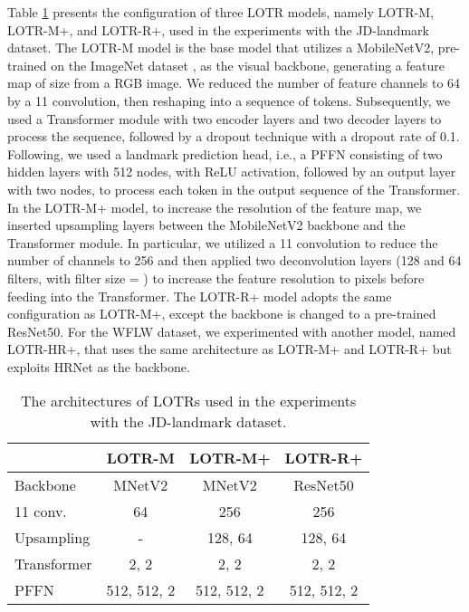 \documentclass[journal]{IEEEtran}
\begin{document}
Table \ref{tab:lotr_models} presents the configuration of three LOTR models, namely LOTR-M, LOTR-M+, and LOTR-R+, used in the experiments with the JD-landmark dataset. 
The LOTR-M model is the base model that utilizes a MobileNetV2, pre-trained on the ImageNet dataset \cite{imagenet09}, as the visual backbone, generating a feature map of size  from a  RGB image. 
We reduced the number of feature channels to 64 by a 11 convolution, then reshaping into a sequence of tokens.
Subsequently, we used a Transformer module with two encoder layers and two decoder layers to process the sequence, followed by a dropout technique \cite{srivastava14a} with a dropout rate of 0.1.
Following, we used a landmark prediction head, i.e., a PFFN consisting of two hidden layers with 512 nodes, with ReLU activation, followed by an output layer with two nodes, to process each token in the output sequence of the Transformer.
In the LOTR-M+ model, to increase the resolution of the feature map, we inserted upsampling layers between the MobileNetV2 backbone and the Transformer module.
In particular, we utilized a 11 convolution to reduce the number of channels to 256 and then applied two deconvolution layers (128 and 64 filters, with filter size  = ) to increase the feature resolution to  pixels before feeding into the Transformer.
The LOTR-R+ model adopts the same configuration as LOTR-M+, except the backbone is changed to a pre-trained ResNet50.
For the WFLW dataset, we experimented with another model, named LOTR-HR+, that uses the same architecture as LOTR-M+ and LOTR-R+ but exploits HRNet \cite{Wang2021HRNet} as the backbone.

\begin{table}
\caption{The architectures of LOTRs used in the experiments with the JD-landmark dataset.}
\centering
\begin{tabular}{lccc}
\hline
                 & LOTR-M & LOTR-M+ & LOTR-R+ \\
\hline
Backbone         & MNetV2 & MNetV2 & ResNet50 \\
11 conv. & 64 & 256 & 256 \\
Upsampling       & - & 128, 64 & 128, 64 \\
\hline
Transformer      & 2, 2 & 2, 2 & 2, 2 \\
\hline
PFFN             & 512, 512, 2 & 512, 512, 2 & 512, 512, 2 \\
\hline
\end{tabular}
\newline
\label{tab:lotr_models}
\end{table}
\end{document}
